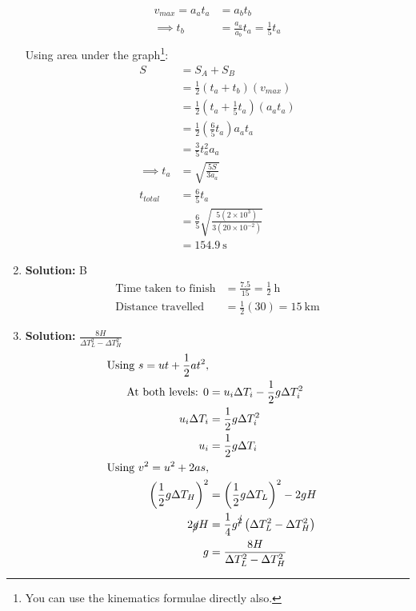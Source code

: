 \documentclass[11pt]{article}
\newcommand{\solution}[1]{\textbf{Solution: } #1 \hspace{5mm}}
\begin{document}
\begin{multicols}{2}
\begin{enumerate}
\begin{align*}
				v_{max} = a_at_a &= a_bt_b \\
				\implies t_b &= \frac{a_a}{a_b}t_a = \frac{1}{5}t_a\\
			\end{align*}
			Using area under the graph\footnote{You can use the kinematics formulae directly also.}: 
			\begin{align*}
			S &= S_A + S_B \\
			&= \frac{1}{2}(t_a + t_b)(v_{max}) \\
			&= \frac{1}{2}\left(t_a + \frac{1}{5}t_a\right)(a_at_a) \\
			&= \frac{1}{2}\left(\frac{6}{5}t_a\right)a_at_a \\
			&= \frac{3}{5}t_a^2a_a \\
			\implies t_a &= \sqrt{\frac{5S}{3a_a}} \\
			t_{total} &= \frac{6}{5}t_a \\
			&= \frac{6}{5}\sqrt{\frac{5(2\times 10^3)}{3(20\times 10^{-2})}} \\
			&= 154.9 ~\text{s}
			\end{align*}
			
			\item \solution{B}
			\begin{align*}
				\text{Time taken to finish} &= \frac{7.5}{15} = \frac{1}{2} ~\text{h} \\
				\text{Distance travelled} &= \frac{1}{2} (30) = 15 ~\text{km}
			\end{align*}
			\vspace{10cm}
			
			\item \solution{$\displaystyle \frac{8H}{\Delta T_L^2-\Delta T_H^2}$}
			\begin{align*}
				\text{Using } s = ut + \frac{1}{2}at^2,\\
				\text{At both levels: } 0 &= u_i\Delta T_i - \frac{1}{2}g\Delta T_i^2 \\
				u_i\Delta T_i &= \frac{1}{2}g\Delta T_i^2 \\
				u_i &= \frac{1}{2}g\Delta T_i \\
				\text{Using } v^2 = u^2 +2as, \\
				\left(\frac{1}{2}g\Delta T_H\right)^2 &= \left(\frac{1}{2}g\Delta T_L\right)^2 - 2gH \\
				2\cancel{g}H &= \frac{1}{4}g^{\cancel{2}}\left(\Delta T_L^2-\Delta T_H^2\right) \\
				g &= \frac{8H}{\Delta T_L^2-\Delta T_H^2}
			\end{align*}
			

\end{enumerate}
\end{multicols}
\end{document}
